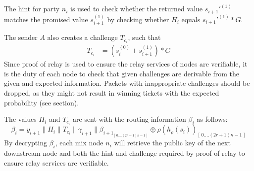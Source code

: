 The hint for party $n_i$ is used to check whether the returned value $s_{i+1}'^{(1)}$ matches the promised value $s_{i+1}^{(1)}$ by checking whether $H_i$ equals $s_{i+1}'^{(1)}*G$. 
   
The sender $A$ also creates a challenge $T_{c_i}$, such that 
   \begin{align}  
    T_{c_i}&=(s_i^{(0)}+s_{i+1}^{(1)})*G
     \end{align}
   Since proof of relay is used to ensure the relay services of nodes are verifiable, it is the duty of each node to check that given challenges are derivable from the given and expected information.
Packets with inappropriate challenges should be dropped, as they might not result in winning tickets with the expected probability (see  section).

The values $H_i$ and $T_{c_i}$ are sent with the routing information $\beta_i$ as follows:
$$\beta_i=y_{i+1}\|H_i\|T_{c_i}\|\gamma_{i+1}\|\beta_{{i+1}_{[ \,0....(2r-1)\kappa-1\,] }}\oplus \rho(h_{\rho}(s_{i}))_{[ \,0....(2r+1)\kappa-1\,]}$$
By decrypting $\beta_i$, each mix node $n_i$ will retrieve the public key of the next downstream node and both the hint and challenge required by proof of relay to ensure relay services are verifiable.

\begin{comment}
 \begin{figure}[H]
    \centering
    \begin{tabular}{| m{2em} | m{15em} | m{2em} |}
        \hline
        $\alpha$ & $\beta$                   & $\gamma$ \\
                 & \begin{tabular}{| c m{2em} | m{3em} | m{6em} |}
            \hline
            \multicolumn{2}{| c |}{$Y_B$} & $hint_B$                 & $challenge_{BC}$ \\
            \hline
            \multicolumn{2}{| c |}{$Y_C$} & $hint_C$                 & $random$         \\
            \hline
            \multicolumn{2}{| c |}{$Y_D$} & $hint_D$                 & $random$         \\
            \hline
            End                           & \multicolumn{3}{| l |}{}                    \\
            \hline
        \end{tabular} &          \\[3em]
        \hline
    \end{tabular}
    \caption{Sphinx with PoR}
    \label{fig:Sphinx with PoR}
\end{figure}
\end{comment}
